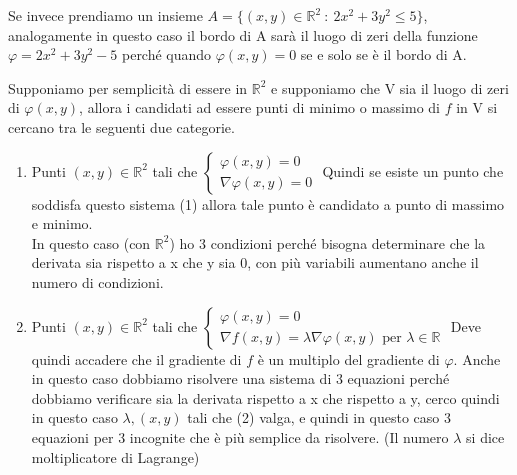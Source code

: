 \begin{example}
Se invece prendiamo un insieme $A = \{(x,y) \in \mathbb{R}^2 \::\: 2x^2 + 3y^2 \leq 5\}$, analogamente in questo caso il bordo di A sarà il luogo di zeri della funzione $\varphi = 2x^2 + 3y^2 -5$ perché quando $\varphi (x,y) = 0$ se e solo se è il bordo di A.
\end{example}

\hspace{-15pt}Supponiamo per semplicità di essere in $\mathbb{R}^2$ e supponiamo che V sia il luogo di zeri di $\varphi(x,y)$, allora i candidati ad essere punti di minimo o massimo di $f$ in V si cercano tra le seguenti due categorie.
\begin{enumerate}
    \item Punti $(x,y) \in \mathbb{R}^2$ tali che $\begin{cases}\varphi(x,y) = 0\\ \nabla \varphi(x,y) = 0\end{cases}$ Quindi se esiste un punto che soddisfa questo sistema (1) allora tale punto è candidato a punto di massimo e minimo.\\
    In questo caso (con $\mathbb{R}^2$) ho 3 condizioni perché bisogna determinare che la derivata sia rispetto a x che y sia 0, con più variabili aumentano anche il numero di condizioni.
    \item Punti $(x,y) \in \mathbb{R}^2$ tali che $\begin{cases}\varphi(x,y) = 0 \\ \nabla f(x,y) = \lambda \nabla \varphi(x,y) \text{ per }\lambda \in \mathbb{R}\end{cases}$ Deve quindi accadere che il gradiente di $f$ è un multiplo del gradiente di $\varphi$. Anche in questo caso dobbiamo risolvere una sistema di 3 equazioni perché dobbiamo verificare sia la derivata rispetto a x che rispetto a y, cerco quindi in questo caso $\lambda, (x,y)$ tali che (2) valga, e quindi in questo caso 3 equazioni per 3 incognite che è più semplice da risolvere. (Il numero $\lambda$ si dice moltiplicatore di Lagrange)
\end{enumerate}

